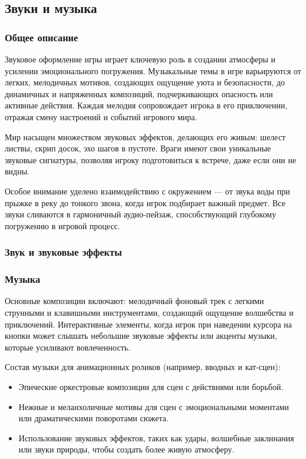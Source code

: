 \documentclass[a4paper,12pt]{article}
\begin{document}
\subsection{Звуки и музыка}
\subsubsection{Общее описание} 
Звуковое оформление игры играет ключевую роль в создании атмосферы и усилении эмоционального погружения. Музыкальные темы в игре варьируются от легких, мелодичных мотивов, создающих ощущение уюта и безопасности, до динамичных и напряженных композиций, подчеркивающих опасность или активные действия. Каждая мелодия сопровождает игрока в его приключении, отражая смену настроений и событий игрового мира.

Мир насыщен множеством звуковых эффектов, делающих его живым: шелест листвы, скрип досок, эхо шагов в пустоте. Враги имеют свои уникальные звуковые сигнатуры, позволяя игроку подготовиться к встрече, даже если они не видны.

Особое внимание уделено взаимодействию с окружением — от звука воды при прыжке в реку до тонкого звона, когда игрок подбирает важный предмет. Все звуки сливаются в гармоничный аудио-пейзаж, способствующий глубокому погружению в игровой процесс.


\subsubsection{Звук и звуковые эффекты} 



\subsubsection{Музыка} 


Основные композиции включают: мелодичный фоновый трек с легкими струнными и клавишными инструментами, создающий ощущение волшебства и приключений.
Интерактивные элементы, когда игрок при наведении курсора на кнопки может слышать небольшие звуковые эффекты или акценты музыки, которые усиливают вовлеченность.


Состав музыки для анимационных роликов (например, вводных и кат-сцен):
\begin{itemize}
    \item Эпические оркестровые композиции для сцен с действиями или борьбой.
    \item Нежные и меланхоличные мотивы для сцен с эмоциональными моментами или драматическими поворотами сюжета.
    \item Использование звуковых эффектов, таких как удары, волшебные заклинания или звуки природы, чтобы создать более живую атмосферу.
\end{itemize}
\end{document}
